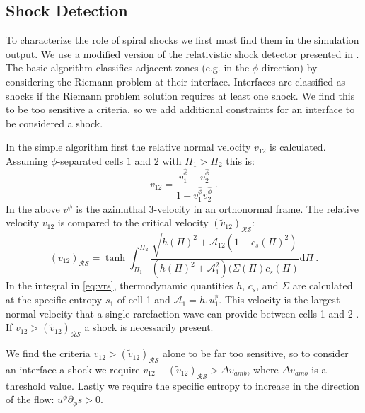 \documentclass{emulateapj}
\newcommand{\Sig}{\Sigma}
\newcommand{\dd}{\mbox{d}}
\begin{document}
\subsection{Shock Detection}
\label{subsec:shockDet}

To characterize the role of spiral shocks we first must find them in the simulation output.  We use a modified version of the relativistic shock detector presented in \citep{Zanotti10}.  The basic algorithm classifies adjacent zones (e.g. in the $\phi$ direction) by considering the Riemann problem at their interface.  Interfaces are classified as shocks if the Riemann problem solution requires at least one shock.  We find this to be too sensitive a criteria, so we add additional constraints for an interface to be considered a shock.

In the simple algorithm first the relative normal velocity $v_{12}$ is calculated.  Assuming $\phi$-separated cells $1$ and $2$ with $\Pi_1 > \Pi_2$ this is:
\begin{equation}
	v_{12} = \frac{v^{\hat{\phi}}_1 - v^{\hat{\phi}}_2}{1 - v^{\hat{\phi}}_1 v^{\hat{\phi}}_2} \ . \label{eq:vrel}
\end{equation}
In the above $v^{\hat{\phi}}$ is the azimuthal 3-velocity in an orthonormal frame. The relative velocity $v_{12}$ is compared to the critical velocity $(\tilde{v}_{12})_{\mathcal{R} \mathcal{S}}$:
\begin{equation}
	(v_{12})_{\mathcal{R}\mathcal{S}} = \tanh \int_{\Pi_1}^{\Pi_2} \frac{\sqrt{h(\Pi)^2 + \mathcal{A}_12(1-c_s(\Pi)^2)}}{(h(\Pi)^2 + \mathcal{A}_1^2)(\Sig(\Pi) c_s(\Pi)} \dd \Pi \ . \label{eq:vrs}
\end{equation}  
In the integral in \eqref{eq:vrs}, thermodynamic quantities $h$, $c_s$, and $\Sig$ are calculated at the specific entropy $s_1$ of cell 1 and $\mathcal{A}_1 = h_1 u_1^{\hat{r}}$.  This velocity is the largest normal velocity that a single rarefaction wave can provide between cells 1 and 2    \citep{Rezzolla03}.  If $v_{12} > (\tilde{v}_{12})_{\mathcal{R}\mathcal{S}}$ a shock is necessarily present.

We find the criteria $v_{12} > (\tilde{v}_{12})_{\mathcal{R}\mathcal{S}}$ alone to be far too sensitive, so to consider an interface a shock we require $v_{12} - (\tilde{v}_{12})_{\mathcal{R}\mathcal{S}} > \Delta v_{amb}$, where $\Delta v_{amb}$ is a threshold value.  Lastly we require the specific entropy to increase in the direction of the flow: $u^\phi \partial_\phi s > 0$.
\end{document}

